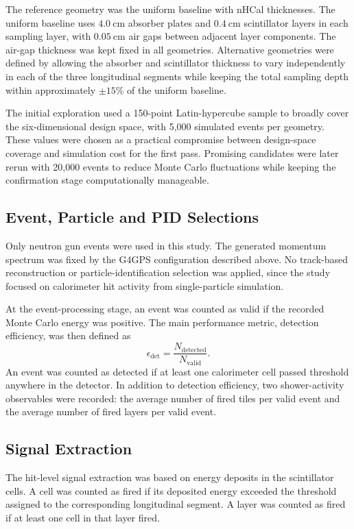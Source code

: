 \noindent The reference geometry was the uniform baseline with nHCal thicknesses. The uniform baseline uses $4.0~\mathrm{cm}$ absorber plates and $0.4~\mathrm{cm}$ scintillator layers in each sampling layer, with $0.05~\mathrm{cm}$ air gaps between adjacent layer components. The air-gap thickness was kept fixed in all geometries. Alternative geometries were defined by allowing the absorber and scintillator thickness to vary independently in each of the three longitudinal segments while keeping the total sampling depth within approximately $\pm 15\%$ of the uniform baseline. 


\noindent The initial exploration used a 150-point Latin-hypercube sample to broadly cover the six-dimensional design space, with 5,000 simulated events per geometry. These values 
were chosen as a practical compromise
between design-space coverage and simulation cost for the first pass. Promising candidates were later rerun with 20,000 events to reduce Monte Carlo fluctuations while keeping the 
confirmation stage computationally manageable.

\subsection{Event, Particle and PID Selections}

\noindent Only neutron gun events were used in this study. The generated momentum spectrum was fixed by the G4GPS configuration described above. No track-based reconstruction
or particle-identification selection was applied, since the study focused on calorimeter hit activity from single-particle simulation.

\noindent At the event-processing stage, an event was counted as valid if the recorded Monte Carlo energy was positive. The main performance metric, detection efficiency, was then defined as
\[
\epsilon_{\mathrm{det}}=\frac{N_{\mathrm{detected}}}{N_{\mathrm{valid}}}.
\]
An event was counted as detected if at least one calorimeter cell passed threshold anywhere in the detector. In addition to detection efficiency, two shower-activity observables
were recorded: the average number of fired tiles per valid event and the average number of fired layers per valid event.

\subsection{Signal Extraction}

\noindent The hit-level signal extraction was based on energy deposits in the scintillator cells. A cell was counted as fired if its deposited energy exceeded the threshold
assigned to the corresponding longitudinal segment. A layer was counted as fired if at least one cell in that layer fired.

